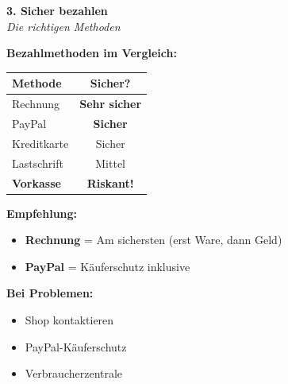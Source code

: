 \documentclass[a4paper,landscape,8pt]{extarticle}
\begin{document}
\begin{minipage}[t]{0.32\linewidth}
\begin{center}
\colorbox{payblue!15}{%
\begin{minipage}{0.95\linewidth}
\vspace{2mm}
\begin{center}
{\Large\bfseries\textcolor{payblue}{3. Sicher bezahlen}}\\[1pt]
{\footnotesize\itshape Die richtigen Methoden}
\end{center}
\vspace{2mm}
\end{minipage}%
}
\end{center}

\vspace{1mm}

\textbf{Bezahlmethoden im Vergleich:}

\vspace{1mm}

{\footnotesize
\begin{tabular}{|l|c|}
\hline
\textbf{Methode} & \textbf{Sicher?} \\
\hline
Rechnung & \textcolor{shopgreen}{\textbf{Sehr sicher}} \\
PayPal & \textcolor{shopgreen}{\textbf{Sicher}} \\
Kreditkarte & Sicher \\
Lastschrift & Mittel \\
\textbf{Vorkasse} & \textcolor{warnred}{\textbf{Riskant!}} \\
\hline
\end{tabular}
}

\vspace{2mm}

\textbf{Empfehlung:}
\begin{itemize}
\item \textbf{Rechnung} = Am sichersten (erst Ware, dann Geld)
\item \textbf{PayPal} = Käuferschutz inklusive
\end{itemize}

\vspace{2mm}

\vspace{2mm}

\textbf{Bei Problemen:}
\begin{itemize}
\item Shop kontaktieren
\item PayPal-Käuferschutz
\item Verbraucherzentrale
\end{itemize}

\end{minipage}
\end{document}

